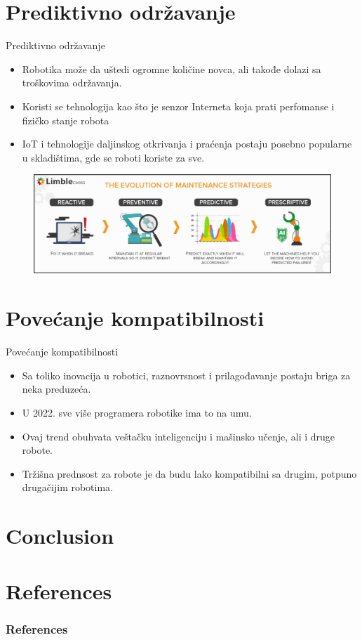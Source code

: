 \documentclass{beamer}
\begin{document}
\section{Prediktivno održavanje}
\begin{frame}{Prediktivno održavanje}
    \begin{itemize}
        \item Robotika može da uštedi ogromne količine novca, ali takođe dolazi sa troškovima održavanja.    
        \item Koristi se tehnologija kao što je senzor Interneta koja prati perfomanse i fizičko stanje robota
        \item IoT i tehnologije daljinskog otkrivanja i praćenja postaju posebno popularne u skladištima, gde se roboti koriste za sve.
    \end{itemize}
    \begin{figure}
        \centering
        \includegraphics[scale=0.20]{dijagram.jpeg}
    \end{figure}
\end{frame}

\section{Povećanje kompatibilnosti}
\begin{frame}{Povećanje kompatibilnosti}
    \begin{itemize}
        \item Sa toliko inovacija u robotici, raznovrsnost i prilagođavanje postaju briga za neka preduzeća.    
        \item U 2022. sve više programera robotike ima to na umu.
        \item Ovaj trend obuhvata veštačku inteligenciju i mašinsko učenje, ali i druge robote.
        \item Tržišna prednsost za robote je da budu lako kompatibilni sa drugim,   potpuno drugačijim robotima.
    \end{itemize}
    
\end{frame}

\section{Conclusion}
%


\section*{References}
\begin{frame}
    \frametitle{References}
    
    
\end{frame}
\end{document}
